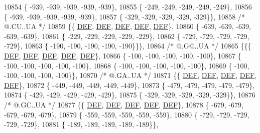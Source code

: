 \begin{DoxyCode}
10854 \{ -939, -939, -939, -939, -939\},
10855 \{ -249, -249, -249, -249, -249\},
10856 \{ -939, -939, -939, -939, -939\},
10857 \{ -329, -329, -329, -329, -329\}\},
10858 \textcolor{comment}{/*  @.CU..UA */}
10859 \{\{  \mbox{\hyperlink{1_88_84__epars_8h_a397419fc12b37ed479c8abb9d444d843}{DEF}},  \mbox{\hyperlink{1_88_84__epars_8h_a397419fc12b37ed479c8abb9d444d843}{DEF}},  \mbox{\hyperlink{1_88_84__epars_8h_a397419fc12b37ed479c8abb9d444d843}{DEF}},  \mbox{\hyperlink{1_88_84__epars_8h_a397419fc12b37ed479c8abb9d444d843}{DEF}},  \mbox{\hyperlink{1_88_84__epars_8h_a397419fc12b37ed479c8abb9d444d843}{DEF}}\},
10860 \{ -639, -639, -639, -639, -639\},
10861 \{ -229, -229, -229, -229, -229\},
10862 \{ -729, -729, -729, -729, -729\},
10863 \{ -190, -190, -190, -190, -190\}\}\},
10864 \textcolor{comment}{/*  @.G@..UA */}
10865 \{\{\{  \mbox{\hyperlink{1_88_84__epars_8h_a397419fc12b37ed479c8abb9d444d843}{DEF}},  \mbox{\hyperlink{1_88_84__epars_8h_a397419fc12b37ed479c8abb9d444d843}{DEF}},  \mbox{\hyperlink{1_88_84__epars_8h_a397419fc12b37ed479c8abb9d444d843}{DEF}},  \mbox{\hyperlink{1_88_84__epars_8h_a397419fc12b37ed479c8abb9d444d843}{DEF}},  \mbox{\hyperlink{1_88_84__epars_8h_a397419fc12b37ed479c8abb9d444d843}{DEF}}\},
10866 \{ -100, -100, -100, -100, -100\},
10867 \{ -100, -100, -100, -100, -100\},
10868 \{ -100, -100, -100, -100, -100\},
10869 \{ -100, -100, -100, -100, -100\}\},
10870 \textcolor{comment}{/*  @.GA..UA */}
10871 \{\{  \mbox{\hyperlink{1_88_84__epars_8h_a397419fc12b37ed479c8abb9d444d843}{DEF}},  \mbox{\hyperlink{1_88_84__epars_8h_a397419fc12b37ed479c8abb9d444d843}{DEF}},  \mbox{\hyperlink{1_88_84__epars_8h_a397419fc12b37ed479c8abb9d444d843}{DEF}},  \mbox{\hyperlink{1_88_84__epars_8h_a397419fc12b37ed479c8abb9d444d843}{DEF}},  \mbox{\hyperlink{1_88_84__epars_8h_a397419fc12b37ed479c8abb9d444d843}{DEF}}\},
10872 \{ -449, -449, -449, -449, -449\},
10873 \{ -479, -479, -479, -479, -479\},
10874 \{ -429, -429, -429, -429, -429\},
10875 \{ -329, -329, -329, -329, -329\}\},
10876 \textcolor{comment}{/*  @.GC..UA */}
10877 \{\{  \mbox{\hyperlink{1_88_84__epars_8h_a397419fc12b37ed479c8abb9d444d843}{DEF}},  \mbox{\hyperlink{1_88_84__epars_8h_a397419fc12b37ed479c8abb9d444d843}{DEF}},  \mbox{\hyperlink{1_88_84__epars_8h_a397419fc12b37ed479c8abb9d444d843}{DEF}},  \mbox{\hyperlink{1_88_84__epars_8h_a397419fc12b37ed479c8abb9d444d843}{DEF}},  \mbox{\hyperlink{1_88_84__epars_8h_a397419fc12b37ed479c8abb9d444d843}{DEF}}\},
10878 \{ -679, -679, -679, -679, -679\},
10879 \{ -559, -559, -559, -559, -559\},
10880 \{ -729, -729, -729, -729, -729\},
10881 \{ -189, -189, -189, -189, -189\}\},

\end{DoxyCode}
